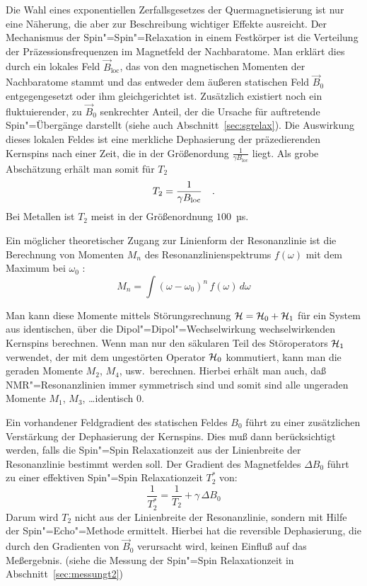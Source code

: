\begin{description}
		Die Wahl eines exponentiellen Zerfallsgesetzes der Quermagnetisierung ist nur eine
		Näherung, die aber zur Beschreibung wichtiger Effekte ausreicht. Der Mechanismus der
		Spin"=Spin"=Relaxation in einem Festkörper ist die Verteilung der Präzessionsfrequenzen im
		Magnetfeld der Nachbaratome. Man erklärt dies durch ein lokales Feld $\vec
		B_\mathrm{loc}$, das von den magnetischen Momenten der Nachbaratome stammt und das
		entweder dem äußeren statischen Feld $\vec B_0$ entgegengesetzt oder ihm gleichgerichtet
		ist. Zusätzlich existiert noch ein fluktuierender, zu $\vec B_0$ senkrechter Anteil, der
		die Ursache für auftretende Spin"=Übergänge darstellt (siehe auch
		Abschnitt~\ref{sec:sgrelax}). Die Auswirkung dieses lokalen Feldes ist eine merkliche
		Dephasierung der präzedierenden Kernspins nach einer Zeit, die in der Größenordung
		$\frac1{\gamma B_\mathrm{loc}}$ liegt. Als grobe Abschätzung erhält man somit für $T_2$
			\begin{equation}
				T_2=\frac1{\gamma B_\mathrm{loc}}\quad\text{.}
			\end{equation}
		Bei Metallen ist $T_2$ meist in der Größenordnung $100$~µs.

		Ein möglicher theoretischer Zugang zur Linienform der Resonanzlinie ist die Berechnung von
		Momenten $M_n$ des Resonanzlinienspektrums $f(\omega)$ mit dem Maximum bei $\omega_0$
		\cite[S. 106ff]{Abragam}:
			\begin{equation}
				M_n = \int(\omega-\omega_0)^n\,f(\omega)\,d\omega
			\end{equation}

Man kann diese Momente mittels Störungsrechnung ${\cal H}={\cal H}_0+{\cal H}_1$ für ein System aus identischen,
über die Dipol"=Dipol"=Wechselwirkung wechselwirkenden Kernspins berechnen. Wenn man nur den
säkularen Teil des Störoperators ${\cal H}_1$ verwendet, der mit dem ungestörten Operator ${\cal H}_0$
kommutiert, kann man die geraden Momente $M_2$, $M_4$, usw.\ berechnen. Hierbei erhält man auch,
daß NMR"=Resonanzlinien immer symmetrisch sind und somit sind alle ungeraden Momente $M_1$, $M_3$,
\ldots identisch 0.

		Ein vorhandener Feldgradient des statischen Feldes $B_0$ führt zu einer zusätzlichen
		Verstärkung der Dephasierung der Kernspins. Dies muß dann
		berücksichtigt werden, falls die Spin"=Spin Relaxationzeit aus der Linienbreite der
		Resonanzlinie bestimmt werden soll. Der Gradient des Magnetfeldes $\Delta B_0$ führt zu
		einer effektiven Spin"=Spin Relaxationzeit $T_2^\ast$ von:
			\begin{equation}
				\label{eqn:t2stern}
				\frac1{T_2^\ast}=\frac1{T_2}+\gamma\,\Delta B_0
			\end{equation}	
		Darum wird $T_2$ nicht aus der Linienbreite der Resonanzlinie, sondern mit Hilfe
		der Spin"=Echo"=Methode ermittelt. Hierbei hat die reversible Dephasierung, die
		durch den Gradienten von $\vec B_0$ verursacht wird, keinen Einfluß auf das Meßergebnis.
		(siehe die Messung der Spin"=Spin Relaxationzeit in Abschnitt~\ref{sec:messungt2})


\end{description}
